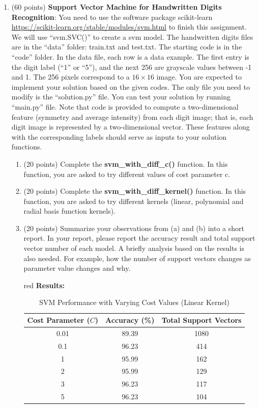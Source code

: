 \documentclass[11pt]{article}
\begin{document}
\begin{enumerate}
\item (60 points) \textbf{Support Vector Machine for Handwritten
Digits Recognition}: You need to use the software package
scikit-learn
\href{https://scikit-learn.org/stable/modules/svm.html}{https://scikit-learn.org/stable/modules/svm.html}
to finish this assignment. We will use ``svm.SVC()'' to create a
svm model. The handwritten digits files are in the ``data''
folder: train.txt and test.txt. The starting code is in the
``code'' folder. In the data file, each row is a data example.
The first entry is the digit label (``1'' or ``5''), and the next
256 are grayscale values between -1 and 1. The 256 pixels
correspond to a $16\times16$ image. You are expected to implement
your solution based on the given codes. The only file you need to
modify is the ``solution.py'' file. You can test your solution by
running ``main.py'' file. Note that code is provided to compute a
two-dimensional feature (symmetry and average intensity) from
each digit image; that is, each digit image is represented by a
two-dimensional vector. These features along with the
corresponding labels should serve as inputs to your solution
functions.
\begin{enumerate}
\item (20 points) Complete the \textbf{svm\_with\_diff\_c()}
function. In this function, you are asked to try different values
of cost parameter c.
\item (20 points) Complete the \textbf{svm\_with\_diff\_kernel()}
function. In this function, you are asked to try different
kernels (linear, polynomial and radial basis function kernels).
\item (20 points) Summarize your observations from (a) and (b)
into a short report. In your report, please report the accuracy
result and total support vector number of each model. A briefly
analysis based on the results is also needed. For example, how
the number of support vectors changes as parameter value changes
and why.


\begin{color}{red}
\textbf{Results:}

\begin{table}[h]
\centering
\begin{tabular}{|c|c|c|}
\hline
\textbf{Cost Parameter ($C$)} & \textbf{Accuracy (\%)} & \textbf{Total Support Vectors} \\ \hline
0.01 & 89.39 & 1080 \\ \hline
0.1  & 96.23 & 414  \\ \hline
1    & 95.99 & 162  \\ \hline
2    & 95.99 & 129  \\ \hline
3    & 96.23 & 117  \\ \hline
5    & 96.23 & 104  \\ \hline
\end{tabular}
\caption{SVM Performance with Varying Cost Values (Linear Kernel)}
\end{table}


\end{color}
\end{enumerate}
\end{enumerate}
\end{document}
